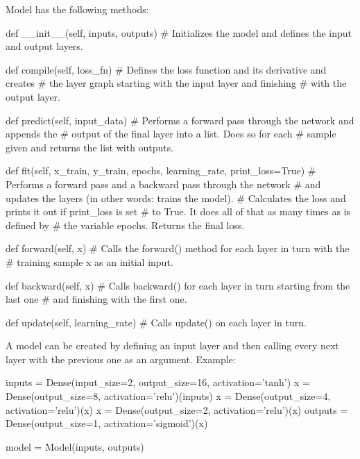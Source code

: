 \documentclass{article}
\begin{document}
    Model has the following methods:
\begin{python}
def __init__(self,
             inputs,
             outputs)
# Initializes the model and defines the input and output layers.
\end{python}
\begin{python}
def compile(self,
            loss_fn)
# Defines the loss function and its derivative and creates
# the layer graph starting with the input layer and finishing
# with the output layer.
\end{python}
\begin{python}
def predict(self,
            input_data)
# Performs a forward pass through the network and appends the
# output of the final layer into a list. Does so for each
# sample given and returns the list with outputs.
\end{python}
\begin{python}
def fit(self,
        x_train,
        y_train,
        epochs,
        learning_rate,
        print_loss=True)
# Performs a forward pass and a backward pass through the network
# and updates the layers (in other words: trains the model).
# Calculates the loss and prints it out if print_loss is set 
# to True. It does all of that as many times as is defined by 
# the variable epochs. Returns the final loss.
\end{python}
\begin{python}
def forward(self,
            x)
# Calls the forward() method for each layer in turn with the 
# training sample x as an initial input.
\end{python}
\begin{python}
def backward(self,
             x)
# Calls backward() for each layer in turn starting from the last one
# and finishing with the first one.
\end{python}
\begin{python}
def update(self,
           learning_rate)
# Calls update() on each layer in turn.
\end{python}

A model can be created by defining an input layer and then calling every next layer
with the previous one as an argument. Example:
\begin{python}
inputs = Dense(input_size=2, output_size=16, activation='tanh')
x = Dense(output_size=8, activation='relu')(inputs)
x = Dense(output_size=4, activation='relu')(x)
x = Dense(output_size=2, activation='relu')(x)
outputs = Dense(output_size=1, activation='sigmoid')(x)

model = Model(inputs, outputs)
\end{python}
\end{document}
